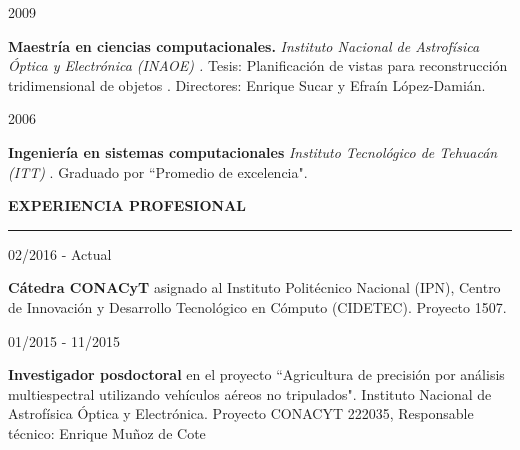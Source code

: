 \documentclass[10pt]{article}
\begin{document}
\begin{minipage}{1.5 in}
	2009\\
\end{minipage}
\begin{minipage}{4.5in}
	\textbf{Maestría en ciencias computacionales.} \textit{Instituto Nacional de Astrofísica Óptica y Electrónica (INAOE) \href{https://www.inaoep.mx/}{\faExternalLink}.} Tesis: Planificación de vistas para reconstrucción tridimensional de objetos \href{https://jivasquez.files.wordpress.com/2015/03/tesis-maestria.pdf}{\faFilePdfO}. Directores: Enrique Sucar y Efraín López-Damián.\\ 
\end{minipage}

\begin{minipage}{1.5 in}
	2006\\
\end{minipage}
\begin{minipage}{4.5in}
	\textbf{Ingeniería en sistemas computacionales} \textit{Instituto Tecnológico de Tehuacán (ITT)} \href{http://www.ittehuacan.edu.mx/}{\faExternalLink}. Graduado por ``Promedio de excelencia".\\ 
\end{minipage} 


{\bf EXPERIENCIA PROFESIONAL}
\vspace{3pt}
\hrule

\begin{minipage}{1.5 in}
	02/2016 - Actual\\
\end{minipage}
\begin{minipage}{4.5in}
	\textbf{Cátedra CONACyT} asignado al Instituto Politécnico Nacional (IPN), Centro de Innovación y Desarrollo Tecnológico en Cómputo (CIDETEC). Proyecto 1507.\\ 
\end{minipage}


\begin{minipage}{1.5 in}
	01/2015 - 11/2015\\
\end{minipage}
\begin{minipage}{4.5in}
	\textbf{Investigador posdoctoral} en el proyecto ``Agricultura de precisión por análisis multiespectral
	utilizando vehículos aéreos no tripulados". Instituto Nacional de Astrofísica Óptica y Electrónica. Proyecto CONACYT 222035, Responsable técnico: Enrique Muñoz de Cote\\ 
\end{minipage}
\end{document}
